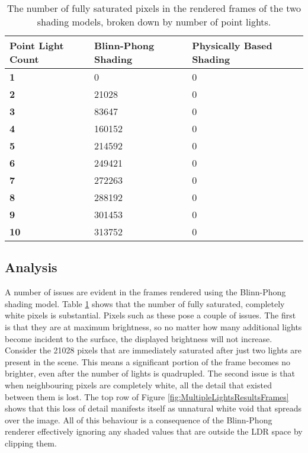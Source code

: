 \begin{table}
	\noindent\begin{tabular}{|l|l|l|}
		\hline
		\textbf{Point Light Count} & \textbf{Blinn-Phong Shading} & \textbf{Physically Based Shading} \\
		\hline\hline
		\textbf{1} & 0 & 0 \\
		\textbf{2} & 21028 & 0 \\
		\textbf{3} & 83647 & 0 \\
		\textbf{4} & 160152 & 0 \\
		\textbf{5} & 214592 & 0 \\
		\textbf{6} & 249421 & 0 \\
		\textbf{7} & 272263 & 0 \\
		\textbf{8} & 288192 & 0 \\
		\textbf{9} & 301453 & 0 \\
		\textbf{10} & 313752 & 0 \\
		\hline
	\end{tabular}
	\caption{The number of fully saturated pixels in the rendered frames of the two shading models, broken down by number of point lights.}
	\label{tb:MultipleLightsResultsSaturatedPixelValues}
\end{table}

\subsection{Analysis}

A number of issues are evident in the frames rendered using the Blinn-Phong shading model. Table \ref{tb:MultipleLightsResultsSaturatedPixelValues} shows that the number of fully saturated, completely white pixels is substantial. Pixels such as these pose a couple of issues. The first is that they are at maximum brightness, so no matter how many additional lights become incident to the surface, the displayed brightness will not increase. Consider the 21028 pixels that are immediately saturated after just two lights are present in the scene. This means a significant portion of the frame becomes no brighter, even after the number of lights is quadrupled. The second issue is that when neighbouring pixels are completely white, all the detail that existed between them is lost. The top row of Figure \ref{fig:MultipleLightsResultsFrames} shows that this loss of detail manifests itself as unnatural white void that spreads over the image. All of this behaviour is a consequence of the Blinn-Phong renderer effectively ignoring any shaded values that are outside the LDR space by clipping them.

